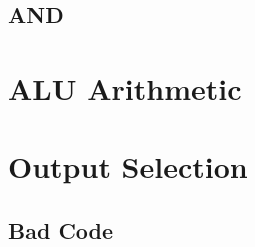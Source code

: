\documentclass[a4paper,11pt]{article}
\begin{document}
\subsection{AND}

\section{ALU Arithmetic}


\section{Output Selection}

\subsection{Bad Code}
\end{document}
